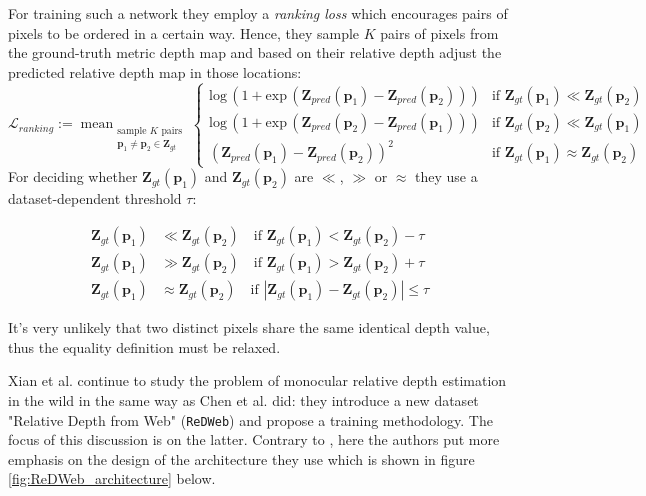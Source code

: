 For training such a network they employ a \textit{ranking loss} which encourages pairs of pixels to be ordered in a certain way.
Hence, they sample $K$ pairs of pixels from the ground-truth metric depth map and based on their relative depth adjust the predicted relative depth map in those locations:
\[
	\mathcal{L}_{ranking} := \mathop{\text{mean}}_{
		\substack{
			\text{sample } K \text{ pairs}\\
			 \mathbf{p}_{1} \neq \mathbf{p}_{2} \in \mathbf{Z}_{gt}}
		}
	\begin{cases}
		\text{log} \, ( 1 + \text{exp} \, ( \mathbf{Z}_{pred}(\mathbf{p}_{1}) - \mathbf{Z}_{pred}(\mathbf{p}_{2}) )) &
			\text{if } \mathbf{Z}_{gt}(\mathbf{p}_{1}) \ll \mathbf{Z}_{gt}(\mathbf{p}_{2}) \\
		\text{log} \, ( 1 + \text{exp} \, ( \mathbf{Z}_{pred}(\mathbf{p}_{2}) - \mathbf{Z}_{pred}(\mathbf{p}_{1}) )) &
			\text{if } \mathbf{Z}_{gt}(\mathbf{p}_{2}) \ll \mathbf{Z}_{gt}(\mathbf{p}_{1}) \\
		(\mathbf{Z}_{pred}(\mathbf{p}_{1}) - \mathbf{Z}_{pred}(\mathbf{p}_{2}) )^{2} &
			\text{if } \mathbf{Z}_{gt}(\mathbf{p}_{1}) \approx \mathbf{Z}_{gt}(\mathbf{p}_{2})
	\end{cases}
\]
For deciding whether $\mathbf{Z}_{gt}(\mathbf{p}_{1})$ and  $\mathbf{Z}_{gt}(\mathbf{p}_{2})$ are $\ll$, $\gg$ or $\approx$ they use a dataset-dependent threshold $\tau$:

\begin{align*}
	\mathbf{Z}_{gt}(\mathbf{p}_{1}) & \ll \mathbf{Z}_{gt}(\mathbf{p}_{2}) \quad
		\text{if } \mathbf{Z}_{gt}(\mathbf{p}_{1}) < \mathbf{Z}_{gt}(\mathbf{p}_{2}) - \tau\\
	\mathbf{Z}_{gt}(\mathbf{p}_{1}) & \gg \mathbf{Z}_{gt}(\mathbf{p}_{2}) \quad
		\text{if } \mathbf{Z}_{gt}(\mathbf{p}_{1}) > \mathbf{Z}_{gt}(\mathbf{p}_{2}) + \tau\\
	\mathbf{Z}_{gt}(\mathbf{p}_{1}) & \approx \mathbf{Z}_{gt}(\mathbf{p}_{2}) \quad
		\text{if } |\mathbf{Z}_{gt}(\mathbf{p}_{1}) - \mathbf{Z}_{gt}(\mathbf{p}_{2})| \leq \tau
\end{align*}

It's very unlikely that two distinct pixels share the same identical depth value, thus the equality definition must be relaxed.

Xian et al. \cite{ReDWeb} continue to study the problem of monocular relative depth estimation in the wild in the same way as Chen et al. \cite{DIW} did: they introduce a new dataset "Relative Depth from Web" (\texttt{ReDWeb}) and propose a training methodology.
The focus of this discussion is on the latter.
Contrary to \cite{DIW}, here the authors put more emphasis on the design of the architecture they use which is shown in figure \ref{fig:ReDWeb_architecture} below.

